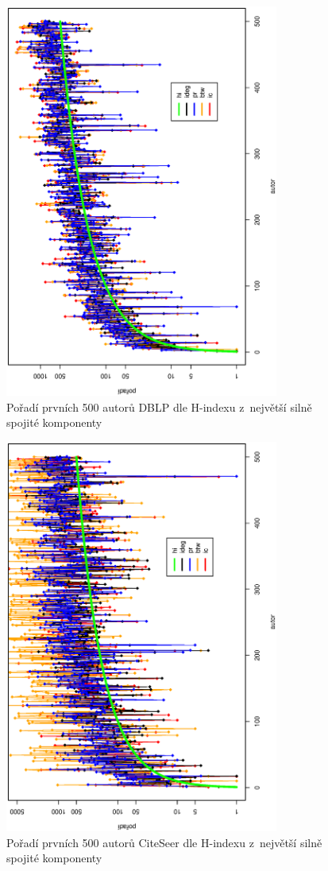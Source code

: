\documentclass{bakalarka}
\begin{document}
\begin{figure}[!ht]
\centering
	\includegraphics[width=9cm,angle=270]{grafDBLP.eps}
	\caption{Pořadí prvních 500 autorů DBLP dle H-indexu z~největší silně spojité komponenty}
	\label{fig:poradiDBLP}
\end{figure}
\begin{figure}[!ht]
\centering
	\includegraphics[width=9cm,angle=270]{grafCS.eps}
	\caption{Pořadí prvních 500 autorů CiteSeer dle H-indexu z~největší silně spojité komponenty}
	\label{fig:poradiCS}
\end{figure}
\end{document}
